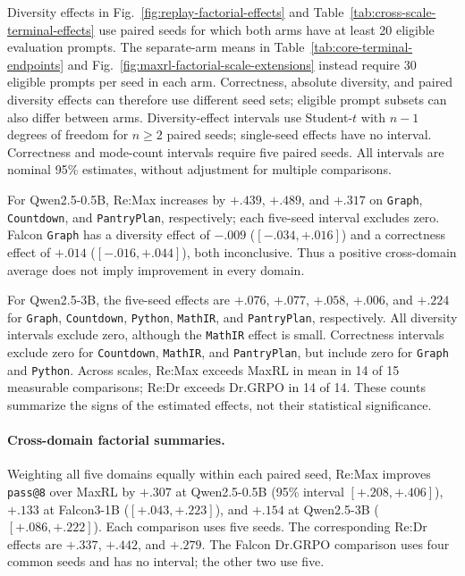 Diversity effects in Fig.~\ref{fig:replay-factorial-effects} and
Table~\ref{tab:cross-scale-terminal-effects} use paired seeds for which
both arms have at least 20 eligible evaluation prompts. The separate-arm
means in Table~\ref{tab:core-terminal-endpoints} and
Fig.~\ref{fig:maxrl-factorial-scale-extensions} instead require 30 eligible
prompts per seed in each arm. Correctness, absolute diversity, and paired
diversity effects can therefore use different seed sets; eligible prompt
subsets can also differ between arms. Diversity-effect intervals use
Student-$t$ with $n-1$ degrees of freedom for $n\ge2$ paired seeds; single-seed
effects have no interval. Correctness and mode-count intervals require five
paired seeds. All intervals are nominal 95\% estimates, without adjustment
for multiple comparisons.

For Qwen2.5-0.5B, Re:Max increases \pmd{} by $+.439$, $+.489$, and
$+.317$ on \texttt{Graph}, \texttt{Countdown}, and \texttt{PantryPlan},
respectively; each five-seed interval excludes zero. Falcon \texttt{Graph}
has a diversity effect of $-.009$ ($[-.034,+.016]$) and a correctness
effect of $+.014$ ($[-.016,+.044]$), both inconclusive. Thus a positive
cross-domain average does not imply improvement in every domain.

For Qwen2.5-3B, the five-seed \pmd{} effects are $+.076$, $+.077$,
$+.058$, $+.006$, and $+.224$ for \texttt{Graph}, \texttt{Countdown},
\texttt{Python}, \texttt{MathIR}, and \texttt{PantryPlan}, respectively.
All diversity intervals exclude zero, although the \texttt{MathIR} effect is
small. Correctness intervals exclude zero for \texttt{Countdown},
\texttt{MathIR}, and \texttt{PantryPlan}, but include zero for \texttt{Graph}
and \texttt{Python}. Across scales, Re:Max exceeds MaxRL in mean \pmd{} in
14 of 15 measurable comparisons; Re:Dr exceeds
Dr.GRPO in 14 of 14. These counts summarize
the signs of the estimated effects, not their statistical significance.

\paragraph{Cross-domain factorial summaries.}
\label{app:factorial-numerical-detail}
Weighting all five domains equally within each paired seed, Re:Max improves
\texttt{pass@8} over MaxRL by $+.307$ at Qwen2.5-0.5B (95\% interval
$[+.208,+.406]$), $+.133$ at Falcon3-1B ($[+.043,+.223]$), and $+.154$
at Qwen2.5-3B ($[+.086,+.222]$). Each comparison uses five seeds. The
corresponding Re:Dr effects are $+.337$, $+.442$, and $+.279$. The Falcon
Dr.GRPO comparison uses four common seeds and has no interval; the other
two use five.

